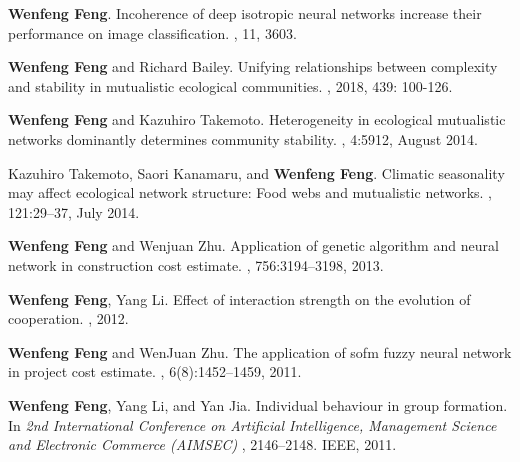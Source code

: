 \documentclass[11pt,a4paper,sans]{moderncv}        %
\begin{document}
\renewcommand{\bibliographyitemlabel}{{\arabic{enumiv}}}
\nocite{*}
\begin{thebibliography}{10}

\textbf{Wenfeng Feng}.
\newblock Incoherence of deep isotropic neural networks increase their performance on image classification.
, 11, 3603.

\textbf{Wenfeng Feng} and Richard Bailey.
\newblock Unifying relationships between complexity and stability in mutualistic ecological communities.
, 2018, 439: 100-126.

\textbf{Wenfeng Feng} and Kazuhiro Takemoto.
\newblock Heterogeneity in ecological mutualistic networks dominantly
  determines community stability.
, 4:5912, August 2014.

Kazuhiro Takemoto, Saori Kanamaru, and \textbf{Wenfeng Feng}.
\newblock Climatic seasonality may affect ecological network structure: Food
  webs and mutualistic networks.
, 121:29--37, July 2014.

\textbf{Wenfeng Feng} and Wenjuan Zhu.
\newblock Application of genetic algorithm and neural network in construction
  cost estimate.
, 756:3194--3198, 2013.

\textbf{Wenfeng Feng}, Yang Li.
\newblock Effect of interaction strength on the evolution of cooperation.
, 2012.

\textbf{Wenfeng Feng} and WenJuan Zhu.
\newblock The application of sofm fuzzy neural network in project cost
  estimate.
, 6(8):1452--1459, 2011.

\textbf{Wenfeng Feng}, Yang Li, and Yan Jia.
\newblock Individual behaviour in group formation.
\newblock In {\em 2nd International Conference on Artificial Intelligence, Management Science and Electronic Commerce (AIMSEC) }, 2146--2148. IEEE, 2011.


\end{thebibliography}
\end{document}

